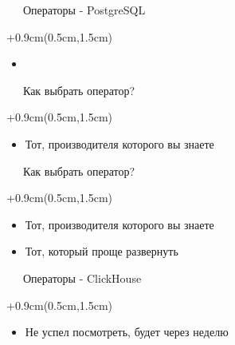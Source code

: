 \documentclass[xetex,18pt,aspectratio=43]{beamer}
\begin{document}
\begin{Large}
\begin{frame}{\ \ \ Операторы - PostgreSQL}
\begin{textblock*}{\framewidth+0.9cm}(0.5cm,1.5cm)
\begin{itemize}
  \item \href{https://github.com/alexclear/vagrant-k8s-freehck-postgres-lab}{\color{linkcolor}{github.com/alexclear/vagrant-k8s-freehck-postgres-lab}}
\end{itemize}
\end{textblock*}
\end{frame}

\begin{frame}{\ \ \ Как выбрать оператор?}
\begin{textblock*}{\framewidth+0.9cm}(0.5cm,1.5cm)
\begin{itemize}
  \item Тот, производителя которого вы знаете
\end{itemize}
\end{textblock*}
\end{frame}

\begin{frame}{\ \ \ Как выбрать оператор?}
\begin{textblock*}{\framewidth+0.9cm}(0.5cm,1.5cm)
\begin{itemize}
  \item Тот, производителя которого вы знаете
  \item Тот, который проще развернуть
\end{itemize}
\end{textblock*}
\end{frame}

\begin{frame}{\ \ \ Операторы - ClickHouse}
\begin{textblock*}{\framewidth+0.9cm}(0.5cm,1.5cm)
\begin{itemize}
  \item Не успел посмотреть, будет через неделю    
\end{itemize}
\end{textblock*}
\end{frame}


\end{Large}
\end{document}
